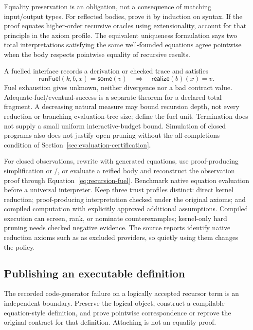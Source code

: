 Equality preservation is an obligation, not a consequence of matching
input/output types. For reflected bodies, prove it by induction on syntax.
If the proof equates higher-order recursive oracles using extensionality,
account for that principle in the axiom profile. The equivalent uniqueness
formulation says two total interpretations satisfying the same well-founded
equations agree pointwise when the body respects pointwise equality of
recursive results.

A fuelled interface records a derivation or checked trace and satisfies
\begin{equation}\label{eq:recursion-fuel}
 \mathsf{runFuel}(k,b,x)=\mathsf{some}(v)
 \quad\Longrightarrow\quad \mathsf{realize}(b)(x)=v.
\end{equation}
Fuel exhaustion gives unknown, neither divergence nor a bad contract value.
Adequate-fuel/eventual-success is a separate theorem for a declared total
fragment. A decreasing natural measure may bound recursion depth, not every
reduction or branching evaluation-tree size; define the fuel unit. Termination
does not supply a small uniform interactive-budget bound. Simulation of closed
programs also does not justify open pruning without the all-completions
condition of Section~\ref{sec:evaluation-certification}.

For closed observations, rewrite with generated equations, use proof-producing
simplification or /, or evaluate a reified body and
reconstruct the observation proof through Equation~\ref{eq:recursion-fuel}.
Benchmark native equation evaluation before a universal interpreter.
Keep three trust profiles distinct: direct kernel reduction; proof-producing
interpretation checked under the original axioms; and compiled computation
with explicitly approved additional assumptions. Compiled execution can screen,
rank, or nominate counterexamples; kernel-only hard pruning needs checked
negative evidence. The source reports identify native reduction axioms such as
 as excluded providers, so quietly using them changes
the policy.\cite{leancbv,leantactics}

\subsection{Publishing an executable definition}\label{sec:recursion-publication}

The recorded code-generator failure on a logically accepted recursor term is
an independent boundary. Preserve the logical object, construct a compilable
equation-style definition, and prove pointwise correspondence or reprove the
original contract for that definition. Attaching  is not
an equality proof.

